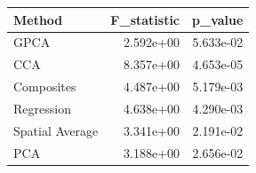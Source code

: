 \begin{tabular}{lrr}
\toprule
Method & F_statistic & p_value \\
\midrule
GPCA & 2.592e+00 & 5.633e-02 \\
CCA & 8.357e+00 & 4.653e-05 \\
Composites & 4.487e+00 & 5.179e-03 \\
Regression & 4.638e+00 & 4.290e-03 \\
Spatial Average & 3.341e+00 & 2.191e-02 \\
PCA & 3.188e+00 & 2.656e-02 \\
\bottomrule
\end{tabular}
